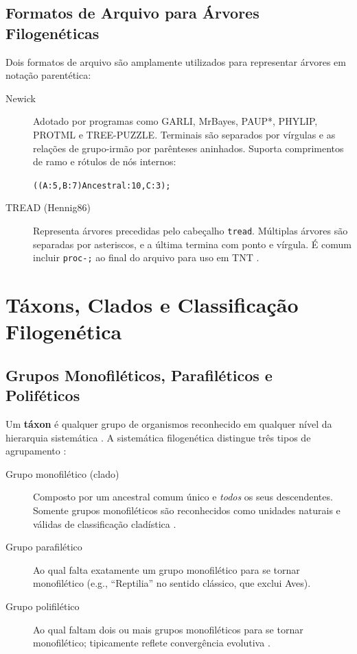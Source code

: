 \subsection{Formatos de Arquivo para Árvores Filogenéticas}

Dois formatos de arquivo são amplamente utilizados para representar árvores em notação parentética:

\begin{description}
    \item[Newick] Adotado por programas como GARLI, MrBayes, PAUP*, PHYLIP, PROTML e TREE-PUZZLE. Terminais são separados por vírgulas e as relações de grupo-irmão por parênteses aninhados. Suporta comprimentos de ramo e rótulos de nós internos:

    \begin{center}
        \texttt{((A:5,B:7)Ancestral:10,C:3);}\\
    \end{center}

    \item[TREAD (Hennig86)] Representa árvores precedidas pelo cabeçalho \texttt{tread}. Múltiplas árvores são separadas por asteriscos, e a última termina com ponto e vírgula. É comum incluir \texttt{proc-;} ao final do arquivo para uso em TNT \parencite{goloboff2008}.
\end{description}

\section{Táxons, Clados e Classificação Filogenética}

\subsection{Grupos Monofiléticos, Parafiléticos e Poliféticos}

Um \textbf{táxon} é qualquer grupo de organismos reconhecido em qualquer nível da hierarquia sistemática \parencite{schuh2009}. A sistemática filogenética distingue três tipos de agrupamento \parencite{hennig1966,schuh2009}:

\begin{description}
    \item[Grupo monofilético (clado)] Composto por um ancestral comum único e \emph{todos} os seus descendentes. Somente grupos monofiléticos são reconhecidos como unidades naturais e válidas de classificação cladística \parencite{hennig1966}.

    \item[Grupo parafilético] Ao qual falta exatamente um grupo monofilético para se tornar monofilético (e.g., ``Reptilia'' no sentido clássico, que exclui Aves).

    \item[Grupo polifilético] Ao qual faltam dois ou mais grupos monofiléticos para se tornar monofilético; tipicamente reflete convergência evolutiva \parencite{schuh2009}.
\end{description}

